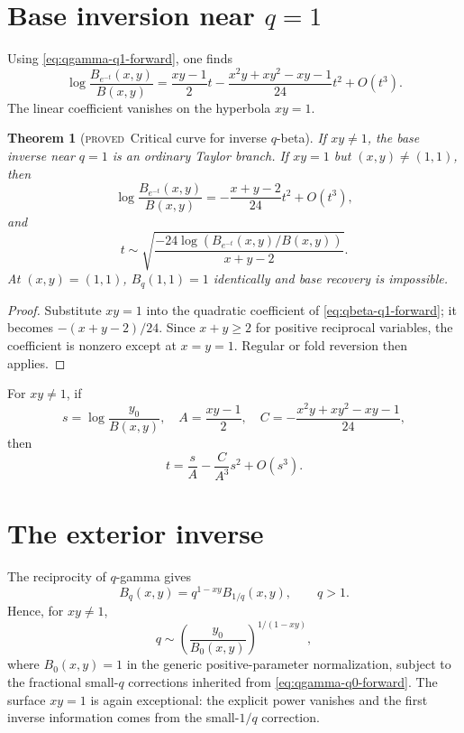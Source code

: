 \documentclass[11pt,letterpaper,oneside,openany]{book}
\newtheorem{theorem}{Theorem}[chapter]
\theoremstyle{definition}
\theoremstyle{remark}
\newcommand{\statusproved}{\textcolor{provedgreen}{\textsc{proved}}}
\begin{document}
\section{Base inversion near \texorpdfstring{\(q=1\)}{q=1}}
Using \eqref{eq:qgamma-q1-forward}, one finds
\begin{equation}\label{eq:qbeta-q1-forward}
 \log\frac{B_{e^{-t}}(x,y)}{B(x,y)}
 =\frac{xy-1}{2}t
 -\frac{x^2y+xy^2-xy-1}{24}t^2+O(t^3).
\end{equation}
The linear coefficient vanishes on the hyperbola \(xy=1\).

\begin{theorem}[\statusproved\ Critical curve for inverse \(q\)-beta]
If \(xy\ne1\), the base inverse near \(q=1\) is an ordinary Taylor branch.  If
\(xy=1\) but \((x,y)\ne(1,1)\), then
\begin{equation}\label{eq:qbeta-critical-forward}
 \log\frac{B_{e^{-t}}(x,y)}{B(x,y)}
 =-\frac{x+y-2}{24}t^2+O(t^3),
\end{equation}
and
\begin{equation}\label{eq:qbeta-critical-inverse}
 t\sim\sqrt{
 \frac{-24\log(B_{e^{-t}}(x,y)/B(x,y))}{x+y-2}}.
\end{equation}
At \((x,y)=(1,1)\), \(B_q(1,1)=1\) identically and base recovery is
impossible.
\end{theorem}
\begin{proof}
Substitute \(xy=1\) into the quadratic coefficient of
\eqref{eq:qbeta-q1-forward}; it becomes \(-(x+y-2)/24\).  Since
\(x+y\ge2\) for positive reciprocal variables, the coefficient is nonzero
except at \(x=y=1\).  Regular or fold reversion then applies.
\end{proof}

For \(xy\ne1\), if
\[
 s=\log\frac{y_0}{B(x,y)},
 \quad A=\frac{xy-1}{2},
 \quad C=-\frac{x^2y+xy^2-xy-1}{24},
\]
then
\[
 t=\frac{s}{A}-\frac{C}{A^3}s^2+O(s^3).
\]

\section{The exterior inverse}
The reciprocity of \(q\)-gamma gives
\begin{equation}\label{eq:qbeta-reciprocity}
 B_q(x,y)=q^{1-xy}B_{1/q}(x,y),
 \qquad q>1.
\end{equation}
Hence, for \(xy\ne1\),
\begin{equation}\label{eq:qbeta-infinity-inverse}
 q\sim\left(\frac{y_0}{B_0(x,y)}\right)^{1/(1-xy)},
\end{equation}
where \(B_0(x,y)=1\) in the generic positive-parameter normalization, subject
to the fractional small-\(q\) corrections inherited from
\eqref{eq:qgamma-q0-forward}.  The surface \(xy=1\) is again exceptional:
the explicit power vanishes and the first inverse information comes from the
small-\(1/q\) correction.
\end{document}
